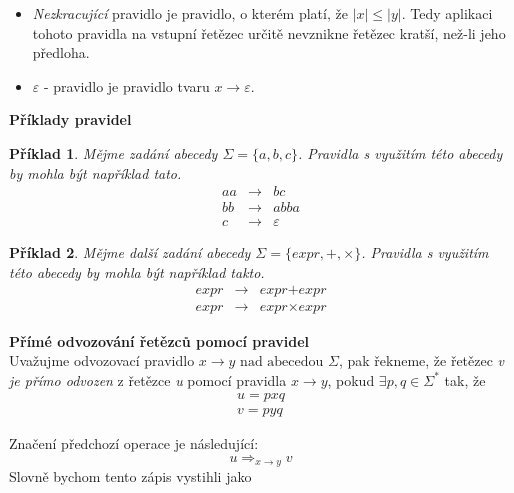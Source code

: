 \documentclass[10pt,a4paper]{article}
\theoremstyle{note}
\newtheorem{priklad}{Příklad}
\begin{document}
		\vspace{3mm}
		\begin{itemize}
		\item \textit{Nezkracující} pravidlo je pravidlo, o kterém platí, že $|x| \leq |y|$. Tedy aplikaci tohoto pravidla
		 na vstupní řetězec určitě nevznikne řetězec kratší, než-li jeho předloha.

		\item $\varepsilon$ - pravidlo je pravidlo tvaru $x \rightarrow \varepsilon$.
		\end{itemize}


		\textbf{Příklady pravidel}\\

		\vspace{3mm}
		\begin{priklad}
		Mějme zadání abecedy $\Sigma = \lbrace a,b,c \rbrace$. Pravidla s využitím této abecedy by mohla být například tato.
		\begin{eqnarray*}
		aa &\rightarrow& bc \\
		bb &\rightarrow& abba \\
		c &\rightarrow& \varepsilon
		\end{eqnarray*}
		\end{priklad}

		\begin{priklad}
		Mějme další zadání abecedy $\Sigma = \lbrace expr, +, \times \rbrace$. Pravidla s využitím této abecedy by 
		mohla být například takto.
		\begin{eqnarray*}
		\textit{expr} &\rightarrow& \textit{expr} + \textit{expr} \\
		\textit{expr} &\rightarrow& \textit{expr} \times \textit{expr}
		\end{eqnarray*}
		\end{priklad}


		\textbf{Přímé odvozování řetězců pomocí pravidel}\\

		\vspace{3mm}
		Uvažujme odvozovací pravidlo $ x \rightarrow y \text{ nad abecedou } \Sigma$, pak řekneme,
		 že řetězec \textit{v} \textit{je přímo odvozen}
		z řetězce \textit{u} pomocí pravidla $ x \rightarrow y $, pokud $\exists p, q \in \Sigma^{*}$ tak, že
		\begin{gather*}
		u = p x q \\
		v = p y q
		\end{gather*}

		Značení předchozí operace je následující:
		$$
		u \Rightarrow_{x \rightarrow y} v
		$$
		Slovně bychom tento zápis vystihli jako 
\end{document}
